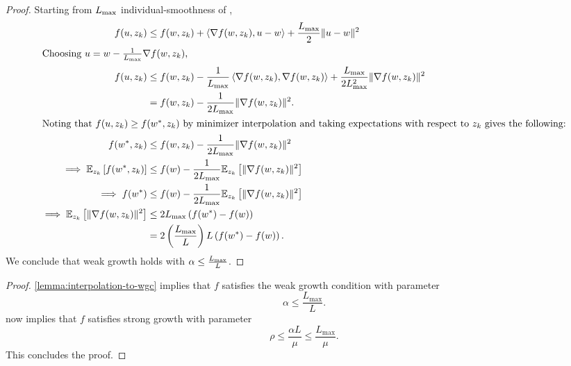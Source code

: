 \interpToWGC*
\begin{proof}
    Starting from \( L_{\text{max}} \) individual-smoothness of \oracle{}, 
    \begin{align*}
        f(u, z_{k}) &\leq f(w, z_{k}) + \left\langle\nabla f(w, z_{k}), u - w\right\rangle + \frac{L_{\text{max}}}{2}\|u - w\|^2\\
        \intertext{Choosing \( u = w- \frac{1}{L_{\text{max}}}\nabla f(w, z_{k}) \),}
        f(u, z_{k}) &\leq f(w, z_{k}) - \frac{1}{L_{\text{max}}}\left\langle\nabla f(w, z_{k}), \nabla f(w,z_{k})\right\rangle + \frac{L_{\text{max}}}{2L_{\text{max}}^2}\|\nabla f(w,z_{k})\|^2\\
        &= f(w, z_{k}) - \frac{1}{2L_{\text{max}}}\|\nabla f(w,z_{k})\|^2.\\
        \intertext{Noting that \( f(u,z_{k}) \geq f(w^*, z_{k}) \) by minimizer interpolation and taking expectations with respect to \( z_{k}\) gives the following:}
        f(w^*, z_{k}) &\leq f(w, z_{k}) - \frac{1}{2L_{\text{max}}}\|\nabla f(w,z_{k})\|^2\\
        \implies \mathbb{E}_{z_{k}}\left[f(w^*, z_{k})\right] &\leq f(w) - \frac{1}{2L_{\text{max}}}\mathbb{E}_{z_{k}}\left[\|\nabla f(w,z_{k})\|^2\right]\\
        \implies f(w^*) &\leq f(w) - \frac{1}{2L_{\text{max}}}\mathbb{E}_{z_{k}}\left[\|\nabla f(w,z_{k})\|^2\right]\\
        \implies \mathbb{E}_{z_{k}} \left[\|\nabla f(w,z_{k})\|^2\right] &\leq 2 L_{\text{max}} \left(f(w^*) - f(w)\right)\\
                                                  &= 2 \left(\frac{L_{\text{max}}}{L}\right) L \left(f(w^*) - f(w)\right).
    \end{align*}
    We conclude that weak growth holds with \( \alpha \leq \frac{L_{\text{max}}}{L} \). 
\end{proof}

\newpage

\interpToSGC*
\begin{proof}
    \autoref{lemma:interpolation-to-wgc} implies that \( f \) satisfies the weak growth condition with parameter
    \[ \alpha \leq \frac{L_{\text{max}}}{L}. \]
    \citet[Proposition 1]{vaswani2019fast} now implies that \( f \) satisfies strong growth with parameter
    \[ \rho \leq \frac{\alpha L}{\mu} \leq \frac{L_{\text{max}}}{\mu}.  \]
    This concludes the proof.
\end{proof}
